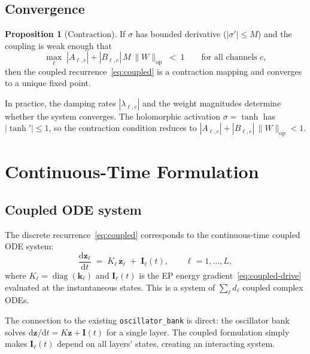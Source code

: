 \documentclass[11pt]{article}
\newcommand{\dd}{\mathrm{d}}
\theoremstyle{definition}
\newtheorem{proposition}{Proposition}
\DeclareMathOperator{\diag}{diag}
\begin{document}
\subsection{Convergence}

\begin{proposition}[Contraction]
If $\sigma$ has bounded derivative ($|\sigma'|\le M$) and the coupling
is weak enough that
\begin{equation}\label{eq:contraction}
  \max_\ell\;|A_{\ell,c}| + |B_{\ell,c}|\,M\,\|W\|_{\text{op}}
  \;<\; 1
  \qquad\text{for all channels $c$},
\end{equation}
then the coupled recurrence~\eqref{eq:coupled} is a contraction
mapping and converges to a unique fixed point.
\end{proposition}

In practice, the damping rates $|\lambda_{\ell,c}|$ and the weight
magnitudes determine whether the system converges.  The holomorphic
activation $\sigma=\tanh$ has $|\tanh'|\le 1$, so the contraction
condition reduces to $|A_{\ell,c}|+|B_{\ell,c}|\,\|W\|_{\text{op}}<1$.

\section{Continuous-Time Formulation}\label{sec:ode}

\subsection{Coupled ODE system}

The discrete recurrence~\eqref{eq:coupled} corresponds to the
continuous-time coupled ODE system:
\begin{equation}\label{eq:coupled-ode}
  \boxed{
  \frac{\dd\bm{z}_\ell}{\dd t}
  \;=\;
  K_\ell\,\bm{z}_\ell
  \;+\;
  \bm{I}_\ell(t),
  \qquad \ell=1,\dots,L,
  }
\end{equation}
where $K_\ell=\diag(\bm{k}_\ell)$ and $\bm{I}_\ell(t)$ is the EP
energy gradient~\eqref{eq:coupled-drive} evaluated at the instantaneous
states.  This is a system of $\sum_\ell d_\ell$ coupled complex ODEs.

The connection to the existing \texttt{oscillator\_bank} is direct:
the oscillator bank solves $\dd\bm{z}/\dd t = K\bm{z}+\bm{I}(t)$
for a single layer.  The coupled formulation simply makes
$\bm{I}_\ell(t)$ depend on all layers' states, creating an interacting
system.
\end{document}

